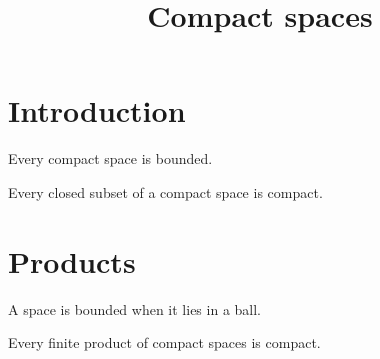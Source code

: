 \documentclass[envcountsame,envcountsect]{svmult}
\begin{document}
\title{Compact spaces}
\maketitle
\section{Introduction}
\begin{theorem} Every compact space is bounded. \end{theorem}
\begin{lemma} Every closed subset of a compact space is compact. \end{lemma}
\section{Products}
\begin{defn} A space is bounded when it lies in a ball. \end{defn}
\begin{theorem} Every finite product of compact spaces is compact. \end{theorem}
\end{document}
